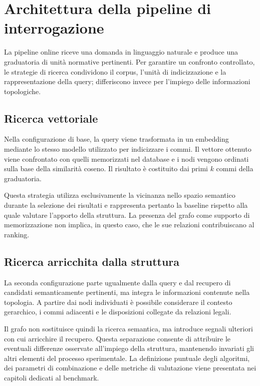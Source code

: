 \section{Architettura della pipeline di interrogazione}

La pipeline online riceve una domanda in linguaggio naturale e produce una graduatoria di unità normative pertinenti. Per garantire un confronto controllato, le strategie di ricerca condividono il corpus, l'unità di indicizzazione e la rappresentazione della query; differiscono invece per l'impiego delle informazioni topologiche.

\subsection{Ricerca vettoriale}

Nella configurazione di base, la query viene trasformata in un embedding mediante lo stesso modello utilizzato per indicizzare i commi. Il vettore ottenuto viene confrontato con quelli memorizzati nel database e i nodi vengono ordinati sulla base della similarità coseno. Il risultato è costituito dai primi $k$ commi della graduatoria.

Questa strategia utilizza esclusivamente la vicinanza nello spazio semantico durante la selezione dei risultati e rappresenta pertanto la baseline rispetto alla quale valutare l'apporto della struttura. La presenza del grafo come supporto di memorizzazione non implica, in questo caso, che le sue relazioni contribuiscano al ranking.

\subsection{Ricerca arricchita dalla struttura}

La seconda configurazione parte ugualmente dalla query e dal recupero di candidati semanticamente pertinenti, ma integra le informazioni contenute nella topologia. A partire dai nodi individuati è possibile considerare il contesto gerarchico, i commi adiacenti e le disposizioni collegate da relazioni legali.

Il grafo non sostituisce quindi la ricerca semantica, ma introduce segnali ulteriori con cui arricchire il recupero. Questa separazione consente di attribuire le eventuali differenze osservate all'impiego della struttura, mantenendo invariati gli altri elementi del processo sperimentale. La definizione puntuale degli algoritmi, dei parametri di combinazione e delle metriche di valutazione viene presentata nei capitoli dedicati al benchmark.

